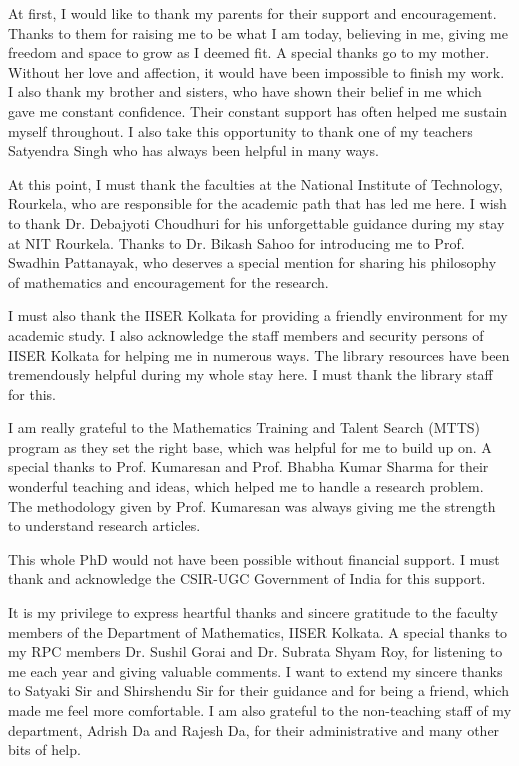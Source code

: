 \hfb At first, I would like to thank my parents for their support and encouragement. Thanks to them for raising me to be what I am today, believing in me, giving me freedom and space to grow as I deemed fit. A special thanks go to my mother. Without her love and affection, it would have been impossible to finish my work. I also thank my brother and sisters, who have shown their belief in me which gave me constant confidence. Their constant support has often helped me sustain myself throughout. I also take this opportunity to thank one of my teachers Satyendra Singh who has always been helpful in many ways.

\vspace{0.3cm}
\hf At this point, I must thank the faculties at the National Institute of Technology, Rourkela, who are responsible for the academic path that has led me here. I wish to thank Dr. Debajyoti Choudhuri for his unforgettable guidance during my stay at NIT Rourkela. Thanks to Dr. Bikash Sahoo for introducing me to Prof. Swadhin Pattanayak, who deserves a special mention for sharing his philosophy of mathematics and encouragement for the research. 

\vspace{0.3cm}
\hf I must also thank the IISER Kolkata for providing a friendly environment for my academic study. I also acknowledge the staff members and security persons of IISER Kolkata for helping me in numerous ways. The library resources have been tremendously helpful during my whole stay here. I must thank the library staff for this. 

\vspace{0.3cm}
\hf  I am really grateful to the Mathematics Training and Talent Search (MTTS) program as they set the right base, which was helpful for me to build up on. A special thanks to Prof. Kumaresan and Prof. Bhabha Kumar Sharma for their wonderful teaching and ideas, which helped me to handle a research problem. The methodology given by Prof. Kumaresan was always giving me the strength to understand research articles. 

\vspace{0.3cm}
\hf This whole PhD would not have been possible without financial support. I must thank and acknowledge the CSIR-UGC Government of India for this support. 

\vspace{0.3cm}
\hf It is my privilege to express heartful thanks and sincere gratitude to the faculty members of the Department of Mathematics, IISER Kolkata. A special thanks to my RPC members Dr. Sushil Gorai and Dr. Subrata Shyam Roy, for listening to me each year and giving valuable comments. I want to extend my sincere thanks to Satyaki Sir and Shirshendu Sir for their guidance and for being a friend, which made me feel more comfortable. I am also grateful to the non-teaching staff of my department, Adrish Da and Rajesh Da, for their administrative and many other bits of help.

